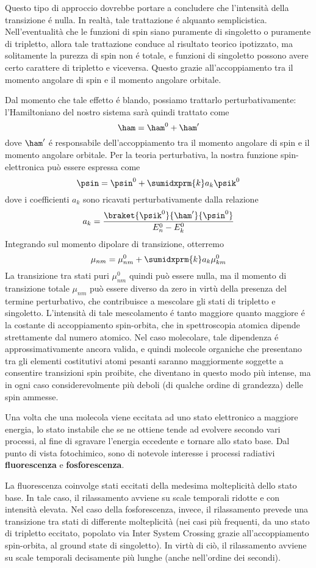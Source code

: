 Questo tipo di approccio dovrebbe portare a concludere che l'intensit\`a della
transizione \'e nulla. In realt\`a, tale trattazione \'e alquanto semplicistica. 
Nell'eventualit\`a che le funzioni di spin siano puramente di singoletto o 
puramente di tripletto, allora tale trattazione conduce al risultato
teorico ipotizzato, ma solitamente la purezza di spin non \'e totale, e 
funzioni di singoletto possono avere certo carattere di tripletto e 
viceversa. Questo grazie all'accoppiamento tra il momento angolare di 
spin e il momento angolare orbitale.

Dal momento che tale effetto \'e blando, possiamo trattarlo
perturbativamente: l'Hamiltoniano del nostro sistema sar\`a quindi
trattato come 
$$
\ham = \ham^0 + \ham'
$$
dove $\ham'$ \'e responsabile dell'accoppiamento tra il momento angolare
di spin e il momento angolare orbitale. Per la teoria perturbativa, la
nostra funzione spin-elettronica pu\`o essere espressa come 
$$
\psin = \psin^0 + \sumidxprm{k} a_k \psik^0 
$$
dove i coefficienti $a_k$ sono ricavati perturbativamente dalla
relazione
$$
a_k = \frac{\braket{\psik^0}{\ham'}{\psin^0}}{E_n^0-E_k^0}
$$
Integrando sul momento dipolare di transizione, otterremo
$$
\mu_{nm} = \mu_{nm}^0 + \sumidxprm{k}a_k\mu_{km}^0
$$
La transizione tra stati puri $\mu_{nm}^0$ quindi pu\`o essere nulla, ma
il momento di transizione totale $\mu_{nm}$ pu\`o essere diverso da zero
in virt\`u della presenza del termine perturbativo, che contribuisce a
mescolare gli stati di tripletto e singoletto. L'intensit\`a di tale
mescolamento \'e tanto maggiore quanto maggiore \'e la costante di
accoppiamento spin-orbita, che in spettroscopia atomica dipende
strettamente dal numero atomico. Nel caso molecolare, tale dipendenza \'e
approssimativamente ancora valida, e quindi molecole organiche che presentano 
tra gli elementi costitutivi atomi pesanti saranno maggiormente soggette a
consentire transizioni spin proibite, che diventano in questo modo pi\`u
intense, ma in ogni caso considerevolmente pi\`u deboli (di qualche
ordine di grandezza) delle spin ammesse.

Una volta che una molecola viene eccitata ad uno stato elettronico a maggiore
energia, lo stato instabile che se ne ottiene tende ad evolvere
secondo vari processi, al fine di sgravare l'energia eccedente e tornare
allo stato base. Dal punto di vista fotochimico, sono di notevole
interesse i processi radiativi \textbf{fluorescenza} e
\textbf{fosforescenza}.

La fluorescenza coinvolge stati eccitati della medesima molteplicit\`a
dello stato base. In tale caso, il rilassamento avviene su scale
temporali ridotte e con intensit\`a elevata.
Nel caso della fosforescenza, invece, il rilassamento prevede una
transizione tra stati di differente molteplicit\`a (nei casi pi\`u
frequenti, da uno stato di tripletto eccitato, popolato via Inter System
Crossing grazie all'accoppiamento spin-orbita, al ground state di
singoletto). In virt\`u di ci\`o, il rilassamento avviene su scale
temporali decisamente pi\`u lunghe (anche nell'ordine dei secondi).

